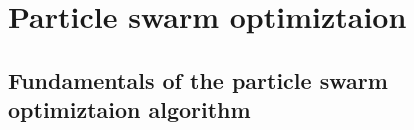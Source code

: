 \section{Particle swarm optimiztaion}
\subsection{Fundamentals of the particle swarm optimiztaion algorithm}
